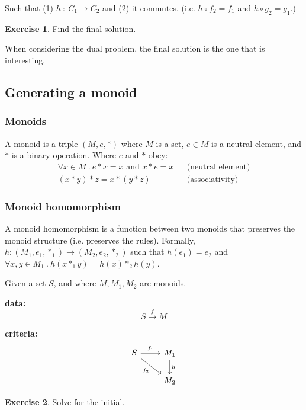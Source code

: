 \documentclass[a4paper, 12pt]{article}
\theoremstyle{definition}
\newtheorem{exercise}{Exercise}
\begin{document}
Such that (1) $h\ :\ C_1 \rightarrow C_2$ and (2) it commutes. (i.e. $h \circ f_2 = f_1$
and $h \circ g_2 = g_1$.)

\begin{exercise}
    Find the final solution.
\end{exercise}

When considering the dual problem, the final solution is the one that is
interesting.

\subsection{Generating a monoid}

\subsubsection*{Monoids}

A monoid is a triple $(M, e, \ast)$ where $M$ is a set, $e \in M$ is a neutral
element, and $\ast$ is a binary operation. Where $e$ and $\ast$ obey:
\begin{align*}
    \forall x \in M\ .\ e \ast x = x \text{ and } x \ast e = x && \text{(neutral
    element)} \\
    (x \ast y) \ast z = x \ast (y \ast z) && \text{(associativity)}
\end{align*}

\subsubsection*{Monoid homomorphism}
A monoid homomorphism is a function between two monoids that preserves the
monoid structure (i.e. preserves the rules). Formally, $h : (M_1, e_1, \ast_1)
\rightarrow (M_2, e_2, \ast_2)$ such that $h(e_1) = e_2$ and $\forall x, y \in
M_1\ .\ h(x \ast_1 y) = h(x) \ast_2 h(y)$.

Given a set $S$, and where $M, M_1, M_2$ are monoids.

\textbf{data:}
$$S \overset{f}{\rightarrow}M$$

\textbf{criteria:}
$$
\begin{tikzcd}
    S \arrow[r, "f_1"] \arrow[dr, swap, "f_2"] & M_1 \arrow[d, "h"] \\
    {} & M_2
\end{tikzcd}
$$

\begin{exercise}
    Solve for the initial.
\end{exercise}
\end{document}
